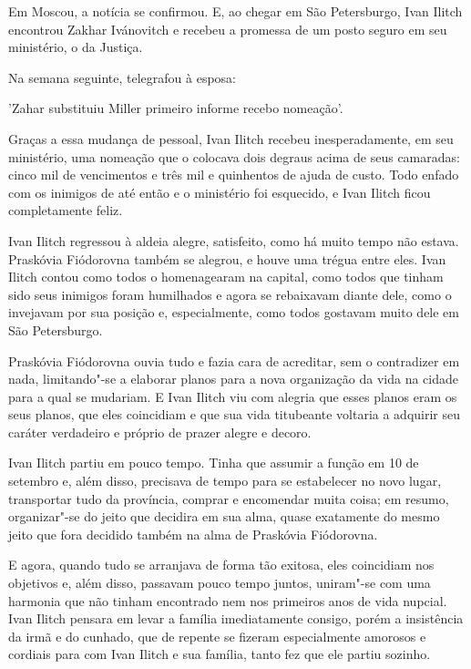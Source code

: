 Em Moscou, a notícia se confirmou. E, ao chegar em São Petersburgo, Ivan
Ilitch encontrou Zakhar Ivánovitch e recebeu a promessa de um posto
seguro em seu ministério, o da Justiça.

Na semana seguinte, telegrafou à esposa:

'Zahar substituiu Miller primeiro informe recebo nomeação'.

Graças a essa mudança de pessoal, Ivan Ilitch recebeu inesperadamente,
em seu ministério, uma nomeação que o colocava dois degraus acima de
seus camaradas: cinco mil de vencimentos e três mil e quinhentos de
ajuda de custo. Todo enfado com os inimigos de até então e o ministério
foi esquecido, e Ivan Ilitch ficou completamente feliz.

Ivan Ilitch regressou à aldeia alegre, satisfeito, como há muito tempo
não estava. Praskóvia Fiódorovna também se alegrou, e houve uma trégua
entre eles. Ivan Ilitch contou como todos o homenagearam na capital,
como todos que tinham sido seus inimigos foram humilhados e agora se
rebaixavam diante dele, como o invejavam por sua posição e,
especialmente, como todos gostavam muito dele em São Petersburgo.

Praskóvia Fiódorovna ouvia tudo e fazia cara de acreditar, sem o
contradizer em nada, limitando"-se a elaborar planos para a nova
organização da vida na cidade para a qual se mudariam. E Ivan Ilitch viu
com alegria que esses planos eram os seus planos, que eles coincidiam e
que sua vida titubeante voltaria a adquirir seu caráter verdadeiro e
próprio de prazer alegre e decoro.

Ivan Ilitch partiu em pouco tempo. Tinha que assumir a função em 10 de
setembro e, além disso, precisava de tempo para se estabelecer no novo
lugar, transportar tudo da província, comprar e encomendar muita coisa;
em resumo, organizar"-se do jeito que decidira em sua alma, quase
exatamente do mesmo jeito que fora decidido também na alma de Praskóvia
Fiódorovna.

E agora, quando tudo se arranjava de forma tão exitosa, eles coincidiam
nos objetivos e, além disso, passavam pouco tempo juntos, uniram"-se com
uma harmonia que não tinham encontrado nem nos primeiros anos de vida
nupcial. Ivan Ilitch pensara em levar a família imediatamente consigo,
porém a insistência da irmã e do cunhado, que de repente se fizeram
especialmente amorosos e cordiais para com Ivan Ilitch e sua família,
tanto fez que ele partiu sozinho.

